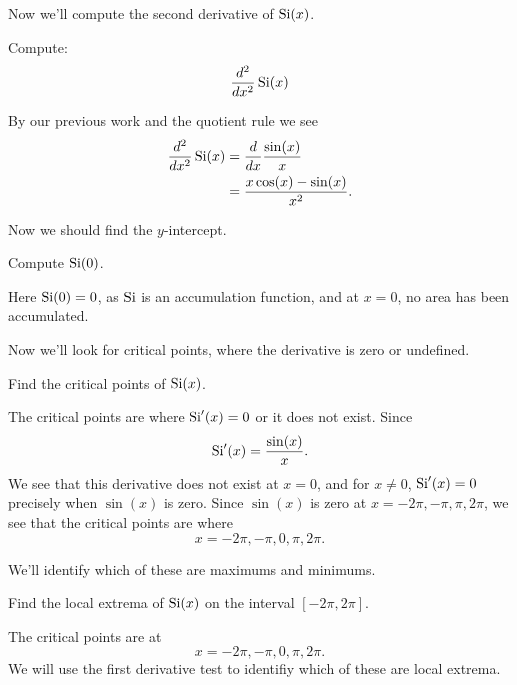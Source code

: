 \documentclass{ximera}
\begin{document}
Now we'll compute the second derivative of $\si(x)$.

\begin{example}
  Compute:
  \[
  \dd[^2]{x^2}\si(x)
  \]
  \begin{explanation}
    By our previous work and the quotient rule we see
    \begin{align*}
      \dd[^2]{x^2} \si(x) &= \ddx \frac{\sin(x)}{x}\\
      &=\frac{x\cos(x) -\sin(x)}{x^2}.
    \end{align*}
  \end{explanation}
\end{example}

Now we should find the $y$-intercept.

\begin{example}
  Compute $\si(0)$.
  \begin{explanation}
    Here $\si(0)=0$, as $\si$ is an accumulation
    function, and at $x=0$, no area has been accumulated.
  \end{explanation}
\end{example}



Now we'll look for critical points, where the derivative is zero or
undefined.

\begin{example}
  Find the critical points of $\si(x)$.
  \begin{explanation}
    The critical points are where $\si'(x)= 0$ or it does not exist.
    Since
    \[
    \si'(x) = \frac{\sin(x)}{x}.
    \]
    We see that this derivative does not exist at $x=0$, and for $x\ne
    0$, $\si'(x)=0$ precisely when $\sin(x)$ is zero. Since $\sin(x)$
    is zero at $x = -2\pi, -\pi, \pi, 2\pi$, we see that the critical
    points are where
    \[
    x= -2\pi, -\pi,0, \pi, 2\pi.
    \]
  \end{explanation}
\end{example}

We'll identify which of these are maximums and minimums.

\begin{example}
  Find the local extrema of $\si(x)$ on the interval $[-2\pi,2\pi]$.
  \begin{explanation}
    The critical points are at
    \[
    x= -2\pi, -\pi,0, \pi, 2\pi.
    \]
    We will use the first derivative test to identifiy which of these
    are local extrema.
    
  \end{explanation}
\end{example}
\end{document}
